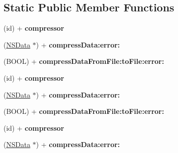 \subsection*{\-Static \-Public \-Member \-Functions}
\begin{DoxyCompactItemize}
\item 
\hypertarget{interface_a_s_i_data_compressor_acafd876efc9a4f67cb36a944962aaaea}{
(id) + {\bfseries compressor}}
\label{interface_a_s_i_data_compressor_acafd876efc9a4f67cb36a944962aaaea}

\item 
\hypertarget{interface_a_s_i_data_compressor_ad261f31ce584a496f08cf508221b1517}{
(\hyperlink{class_n_s_data}{\-N\-S\-Data} $\ast$) + {\bfseries compress\-Data\-:error\-:}}
\label{interface_a_s_i_data_compressor_ad261f31ce584a496f08cf508221b1517}

\item 
\hypertarget{interface_a_s_i_data_compressor_a023b8247b70bb0ccd7b6a47f5fe7fe67}{
(\-B\-O\-O\-L) + {\bfseries compress\-Data\-From\-File\-:to\-File\-:error\-:}}
\label{interface_a_s_i_data_compressor_a023b8247b70bb0ccd7b6a47f5fe7fe67}

\item 
\hypertarget{interface_a_s_i_data_compressor_acafd876efc9a4f67cb36a944962aaaea}{
(id) + {\bfseries compressor}}
\label{interface_a_s_i_data_compressor_acafd876efc9a4f67cb36a944962aaaea}

\item 
\hypertarget{interface_a_s_i_data_compressor_ad261f31ce584a496f08cf508221b1517}{
(\hyperlink{class_n_s_data}{\-N\-S\-Data} $\ast$) + {\bfseries compress\-Data\-:error\-:}}
\label{interface_a_s_i_data_compressor_ad261f31ce584a496f08cf508221b1517}

\item 
\hypertarget{interface_a_s_i_data_compressor_a023b8247b70bb0ccd7b6a47f5fe7fe67}{
(\-B\-O\-O\-L) + {\bfseries compress\-Data\-From\-File\-:to\-File\-:error\-:}}
\label{interface_a_s_i_data_compressor_a023b8247b70bb0ccd7b6a47f5fe7fe67}

\item 
\hypertarget{interface_a_s_i_data_compressor_acafd876efc9a4f67cb36a944962aaaea}{
(id) + {\bfseries compressor}}
\label{interface_a_s_i_data_compressor_acafd876efc9a4f67cb36a944962aaaea}

\item 
\hypertarget{interface_a_s_i_data_compressor_ad261f31ce584a496f08cf508221b1517}{
(\hyperlink{class_n_s_data}{\-N\-S\-Data} $\ast$) + {\bfseries compress\-Data\-:error\-:}}
\label{interface_a_s_i_data_compressor_ad261f31ce584a496f08cf508221b1517}


\end{DoxyCompactItemize}
